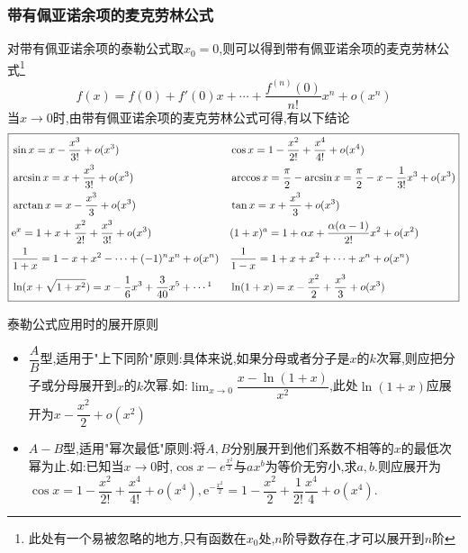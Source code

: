 \documentclass[8pt a4paper, oneside, UTF8]{ctexbook}
\begin{document}
\begin{sloppypar}
    \subsubsection{带有佩亚诺余项的麦克劳林公式}
    对带有佩亚诺余项的泰勒公式取$x_0=0$,则可以得到带有佩亚诺余项的麦克劳林公式\footnote{此处有一个易被忽略的地方,只有函数在$x_0$处,$n$阶导数存在,才可以展开到$n$阶}
    $$
        f(x)=f(0)+f'(0)x+\cdots+\dfrac{f^{(n)}(0)}{n!}x^{n}+o(x^{n})
    $$
    当$x\to 0$时,由带有佩亚诺余项的麦克劳林公式可得,有以下结论
    \begin{align*}
        \boxed{\begin{aligned}
                        & \sin x =x-\dfrac{x^3}{3!}+o(x^3)                                                      &  & \cos x =1-\dfrac{x^2}{2!}+\dfrac{x^4}{4!}+o(x^4)                 \\
                        & \arcsin x =x+\dfrac{x^3}{3!}+o(x^3)                                                   &  & \arccos x=\frac\pi2-\arcsin x=\frac\pi2-x-\frac1{3!}x^3+o(x^3)   \\
                        & \arctan x =x-\dfrac{x^{3}}{3}+o(x^{3})                                                &  & \tan x =x+\dfrac{x^3}3+o(x^3)                                    \\
                        & \mathrm{e}^{x} =1+x+\dfrac{x^{2}}{2!}+\dfrac{x^{3}}{3!}+o(x^{3})                      &  & (1+x)^{a} =1+\alpha x+\dfrac{\alpha(\alpha-1)}{2!}x^{2}+o(x^{2}) \\
                        & \dfrac{1}{1+x}=1-x+x^{2}-\cdots+(-1)^{n}x^{n}+o(x^{n})                                &  & \dfrac{1}{1-x}=1+x+x^{2}+\cdots+x^{n}+o(x^{n})                   \\
                        & \ln (x+\sqrt{1+x^{2}})=x-\dfrac{1}{6}x^{3}+\dfrac{3}{40}x^{5}+\cdots \footnotemark[1] &  & \ln(1+x) =x-\dfrac{x^{2}}{2}+\dfrac{x^{3}}{3}+o(x^{3})
                   \end{aligned}}
    \end{align*}
    \begin{criterion}{泰勒公式应用时的展开原则\label{tlgsyy}}{}
        \begin{itemize}
            \item $\dfrac{A}{B}$型,适用于"上下同阶"原则:具体来说,如果分母或者分子是$x$的$k$次幂,则应把分子或分母展开到$x$的$k$次幂.如:$\lim_{x\to0}\dfrac{x-\ln(1+x)}{x^{2}}$,此处$\ln(1+x)$应展开为$x-\dfrac{x^2}{2}+o(x^2)$
            \item $A-B$型,适用"幂次最低"原则:将$A,B$分别展开到他们系数不相等的$x$的最低次幂为止.如:已知当$x\to0$时,$\cos x-e^{\frac{x^2}2}$与$ax^b$为等价无穷小,求$a,b$.则应展开为$\cos x=1-\dfrac{x^2}{2!}+\dfrac{x^4}{4!}+o(x^4),\mathrm{e}^{-\frac{x^2}{2}}=1-\dfrac{x^2}{2}+\dfrac{1}{2!}\dfrac{x^4}{4}+o(x^4).$

\end{itemize}
\end{criterion}
\end{sloppypar}
\end{document}
